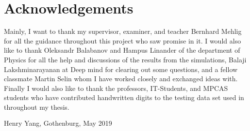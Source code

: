 \thispagestyle{plain}			%
\section*{Acknowledgements}
Mainly, I want to thank my supervisor, examiner, and teacher Bernhard Mehlig for all the guidance throughout this project who saw promise in it. I would also like to thank Oleksandr Balabanov and Hampus Linander of the department of Physics for all the help and discussions of the results from the simulations, Balaji Lakshminarayanan at Deep mind for clearing out some questions, and a fellow classmate Martin Selin whom I have worked closely and exchanged ideas with. Finally I would also like to thank the professors, IT-Students, and MPCAS students who have contributed handwritten digits to the testing data set used in throughout my thesis.

\vspace{1.5cm}
\hfill
Henry Yang, Gothenburg, May 2019

\newpage				%
\thispagestyle{empty}
\mbox{}